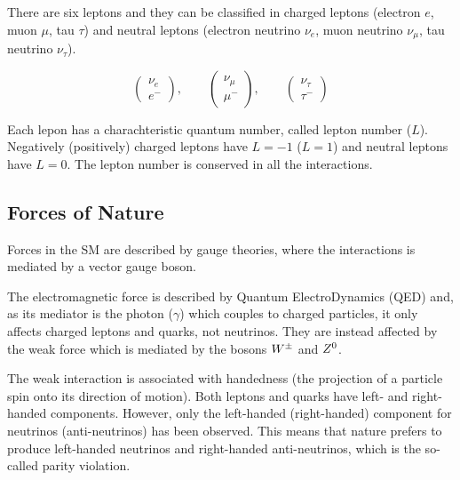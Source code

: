 			There are six leptons and they can be classified in charged leptons (electron $e$, muon $\mu$, tau $\tau$) and neutral leptons (electron neutrino $\nu_e$, muon neutrino $\nu_{\mu}$, tau neutrino $\nu_{\tau}$).

			
			\begin{equation*}
			\label{eq:lepton_flavor_doublets}
				\begin{pmatrix} \nu_e      \\ e^-    \end{pmatrix}, \qquad
				\begin{pmatrix} \nu_{\mu}  \\ \mu^-  \end{pmatrix}, \qquad
				\begin{pmatrix} \nu_{\tau} \\ \tau^- \end{pmatrix}
			\end{equation*}

			\noindent Each lepon has a charachteristic quantum number, called lepton number ($L$). Negatively (positively) charged leptons have $L=-1$ ($L=1$) and neutral leptons have $L=0$. The lepton number is conserved in all the interactions. 



		\subsection*{Forces of Nature}

			Forces in the SM are described by gauge theories, where the interactions is mediated by a vector gauge boson. 

			The electromagnetic force is described by Quantum ElectroDynamics (QED) and, as its mediator is the photon ($\gamma$) which couples to charged particles, it only affects charged leptons and quarks, not neutrinos. They are instead affected by the weak force which is mediated by the bosons $W^{\pm}$ and $Z^0$. 

			The weak interaction is associated with handedness (the projection of a particle spin onto its direction of motion). Both leptons and quarks have left- and right-handed components. However, only the left-handed (right-handed) component for neutrinos (anti-neutrinos) has been observed. This means that nature prefers to produce left-handed neutrinos and right-handed anti-neutrinos, which is the so-called parity violation. 

